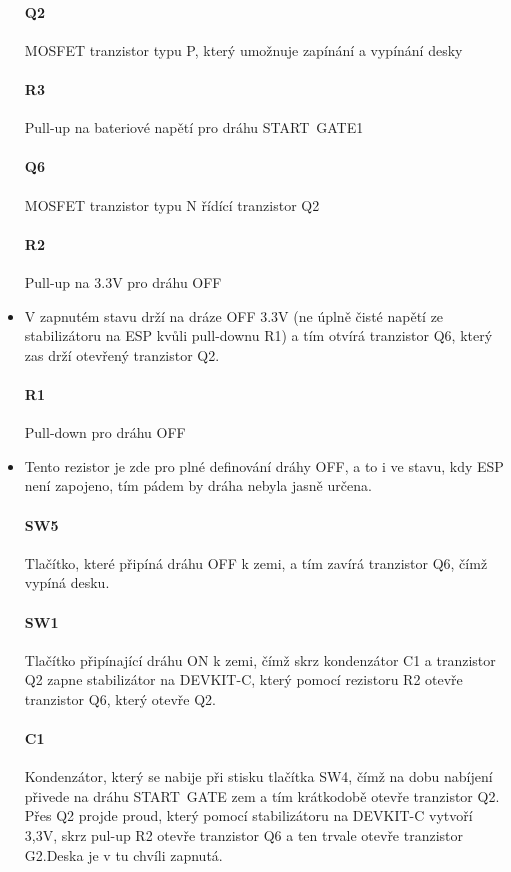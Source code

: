 \documentclass{template/socthesis}
\begin{document}
\begin{itemize}
	\paragraph*{Q2}
	MOSFET tranzistor typu P, který umožnuje zapínání a vypínání desky
	\paragraph*{R3}
	Pull-up na bateriové napětí pro dráhu START~GATE1
	\paragraph*{Q6}
	MOSFET tranzistor typu N řídící tranzistor Q2
	\paragraph{R2}
	Pull-up na 3.3V pro dráhu OFF
	\item V zapnutém stavu drží na dráze OFF 3.3V
	(ne úplně čisté napětí ze stabilizátoru na ESP kvůli pull-downu R1) a tím otvírá tranzistor Q6, který zas drží otevřený tranzistor Q2.
	
	\paragraph*{R1}
	Pull-down pro dráhu OFF
	\item Tento rezistor je zde pro plné definování dráhy OFF,
	a to i ve stavu, kdy ESP není zapojeno, tím pádem by dráha nebyla jasně určena.
	
	\paragraph*{SW5}
	Tlačítko, které připíná dráhu OFF k zemi, a tím zavírá tranzistor Q6, čímž vypíná desku.
	
	\paragraph*{SW1}
	Tlačítko připínající dráhu ON k zemi, čímž skrz kondenzátor C1 a tranzistor Q2 zapne stabilizátor na DEVKIT-C, který pomocí rezistoru R2 otevře tranzistor Q6, který otevře Q2. 
	
	\paragraph*{C1}
	Kondenzátor, který se nabije při stisku tlačítka SW4, čímž na dobu nabíjení přivede na dráhu START~GATE zem a tím krátkodobě otevře tranzistor Q2. Přes Q2 projde proud, který pomocí stabilizátoru na DEVKIT-C vytvoří 3,3V, skrz pul-up R2 otevře tranzistor Q6 a ten trvale otevře tranzistor G2.Deska je v tu chvíli zapnutá.
	

\end{itemize}
\end{document}
